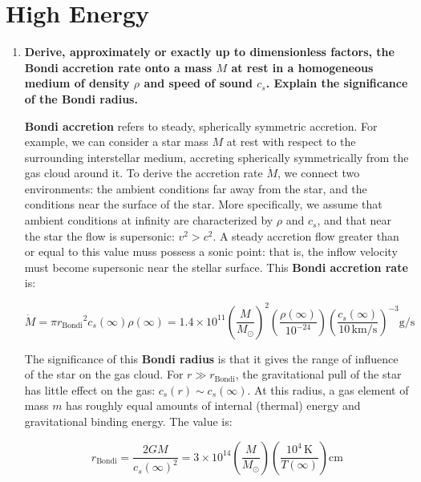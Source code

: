 \documentclass[12pt, letterpaper, preprint]{aastex}
\newcommand{\rbondi}{\mbox{$r_\mathrm{Bondi}$}}
\begin{document}
\newpage

\section*{High Energy}

\begin{enumerate}

\item \textbf{Derive, approximately or exactly up to dimensionless factors, the Bondi accretion rate onto a mass $M$ at rest in a homogeneous medium of density $\rho$ and speed of sound $c_s$. Explain the significance of the Bondi radius.}

\textbf{Bondi accretion} refers to steady, spherically symmetric accretion. For example, we can consider a star mass $M$ at rest with respect to the surrounding interstellar medium, accreting spherically symmetrically from the gas cloud around it.
To derive the accretion rate $\dot{M}$, we connect two environments:
the ambient conditions far away from the star,
and the conditions near the surface of the star.
More specifically, we assume that ambient conditions at infinity are characterized by $\rho$ and $c_s$, and that near the star 
the flow is supersonic: $v^2 > c^2$.
A steady accretion flow greater than or equal to this value muss possess a sonic point: that is, the inflow velocity must become supersonic near the stellar surface.
This \textbf{Bondi accretion rate} is:

\begin{equation}
\dot{M} = \pi \rbondi^2 c_s(\infty) \rho(\infty)
= 1.4 \times 10^{11} \left( \frac{M}{M_\odot} \right)^2 \left( \frac{\rho(\infty)}{10^{-24}} \right) \left( \frac{c_s(\infty)}{10\, \mathrm{km/s}} \right)^{-3} \mathrm{g/s}
\end{equation}

The significance of this \textbf{Bondi radius} is that it gives the range of influence of the star on the gas cloud. For $r \gg \rbondi$, the gravitational pull of the star has little effect on the gas: $c_s(r) \sim c_s(\infty)$. At this radius, a gas element of mass $m$ has roughly equal amounts of internal (thermal) energy and gravitational binding energy. The value is:

\begin{equation}
\rbondi = \frac{2GM}{c_s(\infty)^2} 
= 3 \times 10^{14} \left( \frac{M}{M_\odot} \right) \left( \frac{10^4\, \mathrm{K}}{T(\infty)} \right) \mathrm{cm}
\end{equation}


\end{enumerate}
\end{document}
